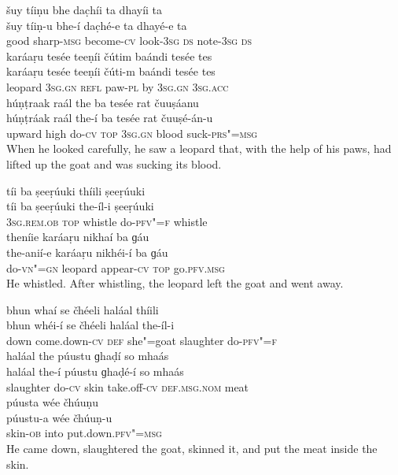 \begin{exe}
\ex
\label{ex:5}
\glll šuy	tíiṇu	bhe	dac̣híi	ta	dhayíi	ta \\
šuy	tíiṇ-u	bhe-í	dac̣hé-e	ta	dhayé-e	ta \\
good	sharp-\textsc{msg}	become-\textsc{cv}	look-\textsc{3sg} \textsc{ds}	note-\textsc{3sg} \textsc{ds} \\
\glll karáaṛu	tesée	teeṇíi	čútim	baándi	tesée	tes \\
karáaṛu	tesée	teeṇíi	čúti-m	baándi	tesée	tes \\
leopard	\textsc{3sg.gn} \textsc{refl}	paw-\textsc{pl}	by	\textsc{3sg.gn} \textsc{3sg.acc} \\
\glll húṇṭraak	raál	the	ba	tesée	rat čuuṣáanu \\
húṇṭráak	raál	the-í	ba	tesée	rat čuuṣé-án-u \\
upward	high	do-\textsc{cv}	\textsc{top} \textsc{3sg.gn}	blood suck-\textsc{prs"=msg} \\
\glt When he looked carefully, he saw a leopard that, with the help of his paws, had lifted up the goat and was sucking its blood.

\ex
\label{ex:6}
\glll tíi	ba	ṣeeṛúuki	thíili	ṣeeṛúuki \\
tíi	ba	ṣeeṛúuki	the-íl-i	ṣeeṛúuki \\
\textsc{3sg.rem.ob}	\textsc{top}	whistle	do-\textsc{pfv"=f}	whistle \\
\glll theníie	karáaṛu	nikhaí	ba	ɡáu \\
the-anií-e	karáaṛu	nikhéi-í	ba	ɡáu \\
do-\textsc{vn"=gn}	leopard	appear-\textsc{cv} \textsc{top}	go.\textsc{pfv.msg} \\
\glt He whistled. After whistling, the leopard left the goat and went away.

\ex
\label{ex:7}
\glll bhun	whaí	se	čhéeli	haláal	thíili \\
bhun	whéi-í	se	čhéeli	haláal	the-íl-i \\
down	come.down-\textsc{cv} \textsc{def}	she"=goat	slaughter	do-\textsc{pfv"=f} \\
\glll haláal	the	púustu	ɡhaḍí	so	mhaás \\
haláal	the-í	púustu	ɡhaḍé-í	so	mhaás \\
slaughter	do-\textsc{cv}	skin	take.off-\textsc{cv} \textsc{def.msg.nom}	meat \\
\glll púusta	wée	čhúuṇu\\
púustu-a	wée	čhúuṇ-u\\
skin-\textsc{ob}	into	put.down.\textsc{pfv"=msg}\\
\glt He came down, slaughtered the goat, skinned it, and put the meat inside the skin.


\end{exe}
